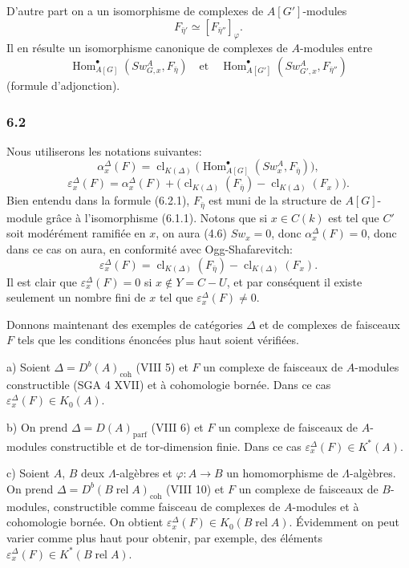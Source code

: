 \documentclass[11pt]{article}
\DeclareMathOperator{\Hom}{Hom}
\providecommand{\parf}{\mathrm{parf}}
\providecommand{\coh}{\mathrm{coh}}
\providecommand{\Hom}{\operatorname{Hom}}
\providecommand{\parf}{\mathrm{parf}}
\providecommand{\coh}{\mathrm{coh}}
\providecommand{\clK}[1]{\operatorname{cl}_{K(#1)}}
\begin{document}
D'autre part on a un isomorphisme de complexes de $A[G']$-modules
\[
F_{\bar\eta'}\simeq [F_{\bar\eta''}]_\varphi.
\]
Il en résulte un isomorphisme canonique de complexes de $A$-modules entre
\[
\Hom^\bullet_{A[G]}(Sw_{G,x}^A,F_{\bar\eta})
\quad\text{et}\quad
\Hom^\bullet_{A[G']}(Sw_{G',x}^A,F_{\bar\eta''})
\]
(formule d'adjonction).

\subsubsection*{6.2}

Nous utiliserons les notations suivantes:
\[
\alpha_x^\Delta(F)
=
\clK{\Delta}\bigl(\Hom^\bullet_{A[G]}(Sw_x^A,F_{\bar\eta})\bigr),
\tag{6.2.1}
\]
\[
\varepsilon_x^\Delta(F)
=
\alpha_x^\Delta(F)+
\bigl(\clK{\Delta}(F_{\bar\eta})-\clK{\Delta}(F_x)\bigr).
\tag{6.2.2}
\]
Bien entendu dans la formule (6.2.1), $F_{\bar\eta}$ est muni de la structure de $A[G]$-module grâce à l'isomorphisme (6.1.1). Notons que si $x\in C(k)$ est tel que $C'$ soit modérément ramifiée en $x$, on aura (4.6) $Sw_x=0$, donc $\alpha_x^\Delta(F)=0$, donc dans ce cas on aura, en conformité avec Ogg-Shafarevitch:
\[
\varepsilon_x^\Delta(F)=\clK{\Delta}(F_{\bar\eta})-\clK{\Delta}(F_x).
\tag{6.2.3}
\]
Il est clair que $\varepsilon_x^\Delta(F)=0$ si $x\notin Y=C-U$, et par conséquent il existe seulement un nombre fini de $x$ tel que $\varepsilon_x^\Delta(F)\ne0$.

Donnons maintenant des exemples de catégories $\Delta$ et de complexes de faisceaux $F$ tels que les conditions énoncées plus haut soient vérifiées.

a) Soient $\Delta=D^b(A)_{\coh}$ (VIII 5) et $F$ un complexe de faisceaux de $A$-modules constructible (SGA 4 XVII) et à cohomologie bornée. Dans ce cas $\varepsilon_x^\Delta(F)\in K_0(A)$.

b) On prend $\Delta=D(A)_{\parf}$ (VIII 6) et $F$ un complexe de faisceaux de $A$-modules constructible et de tor-dimension finie. Dans ce cas $\varepsilon_x^\Delta(F)\in K^*(A)$.

c) Soient $A$, $B$ deux $\Lambda$-algèbres et $\varphi:A\to B$ un homomorphisme de $\Lambda$-algèbres. On prend $\Delta=D^b(B\operatorname{ rel }A)_{\coh}$ (VIII 10) et $F$ un complexe de faisceaux de $B$-modules, constructible comme faisceau de complexes de $A$-modules et à cohomologie bornée. On obtient $\varepsilon_x^\Delta(F)\in K_0(B\operatorname{ rel }A)$. Évidemment on peut varier comme plus haut pour obtenir, par exemple, des éléments $\varepsilon_x^\Delta(F)\in K^*(B\operatorname{ rel }A)$.
\end{document}
